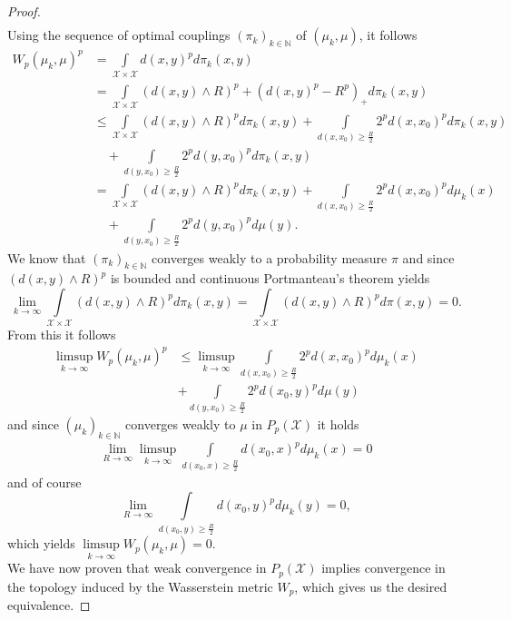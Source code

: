 \documentclass[11pt,a4paper]{article}
\begin{document}
\begin{proof}
\begin{align*}
\end{align*}
Using the sequence of optimal couplings $(\pi_k)_{k\in\mathbb{N}}$ of $(\mu_k,\mu)$, it follows
\begin{align*}
W_p(\mu_k,\mu)^p & = \int\limits_{\mathcal{X\times{}X}}d(x,y)^pd\pi_k(x,y) \\& = \int\limits_{\mathcal{X\times{}X}}\left(d(x,y)\wedge{}R\right)^p + \left(d(x,y)^p-R^p\right)_{+}d\pi_k(x,y) \\& \leq\int\limits_{\mathcal{X\times{}X}}\left(d(x,y)\wedge{}R\right)^pd\pi_k(x,y) + \int\limits_{d(x,x_0)\geq\frac{R}{2}}2^pd(x,x_0)^pd\pi_k(x,y) \\&\quad + \int\limits_{d(y,x_0)\geq\frac{R}{2}}2^pd(y,x_0)^pd\pi_k(x,y)\\& = \int\limits_{\mathcal{X\times{}X}}\left(d(x,y)\wedge{}R\right)^pd\pi_k(x,y) + \int\limits_{d(x,x_0)\geq\frac{R}{2}}2^pd(x,x_0)^pd\mu_k(x) \\&\quad + \int\limits_{d(y,x_0)\geq\frac{R}{2}}2^pd(y,x_0)^pd\mu(y).
\end{align*}
We know that $(\pi_k)_{k\in\mathbb{N}}$ converges weakly to a probability measure $\pi$ and since $\left(d(x,y)\wedge{}R\right)^p$ is bounded and continuous Portmanteau's theorem yields \vspace{0.3em}\\
\[
\lim\limits_{k\rightarrow\infty}\int\limits_{\mathcal{X\times{}X}}\left(d(x,y)\wedge{}R\right)^pd\pi_k(x,y) = \int\limits_{\mathcal{X\times{}X}}\left(d(x,y)\wedge{}R\right)^pd\pi(x,y) = 0.
\]
From this it follows
\begin{align*}
\limsup\limits_{k\rightarrow{}\infty}W_p(\mu_k,\mu)^p & \leq \limsup_{k\rightarrow\infty}\int\limits_{d(x,x_0)\geq\frac{R}{2}}2^pd(x,x_0)^pd\mu_k(x) \\& + \int\limits_{d(y,x_0)\geq\frac{R}{2}}2^pd(x_0,y)^pd\mu(y)
\end{align*}
and since $(\mu_k)_{k\in\mathbb{N}}$ converges weakly to $\mu$ in $P_p(\mathcal{X})$ it holds 
\begin{align*}
\lim\limits_{R\rightarrow\infty}\limsup\limits_{k\rightarrow\infty}\int\limits_{d(x_0,x)\geq\frac{R}{2}}d(x_0,x)^pd\mu_k(x) = 0
\end{align*}
and of course
\[
\lim\limits_{R\rightarrow\infty}\int\limits_{d(x_0,y)\geq\frac{R}{2}}d(x_0,y)^pd\mu_k(y) = 0,
\]
which yields $\limsup\limits_{k\rightarrow\infty}W_p(\mu_k,\mu)=0$. \vspace{1em}\\We have now proven that weak convergence in $P_p(\mathcal{X})$ implies convergence in the topology induced by the Wasserstein metric $W_p$, which gives us the desired equivalence.
\end{proof}
\end{document}
